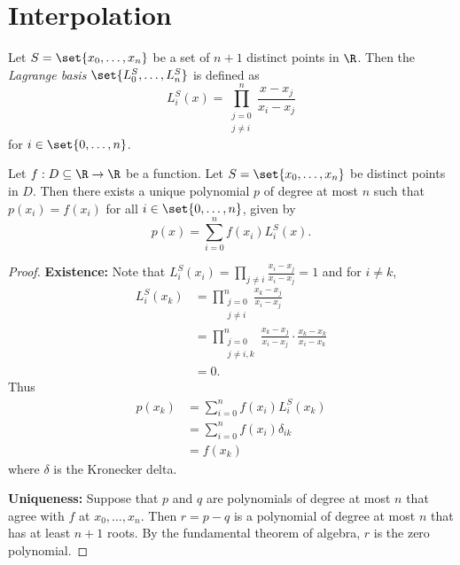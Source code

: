 \documentclass[12pt]{article}
\begin{document}
\section{Interpolation} \label{sec:interpolation}
\begin{definition} \label{def:interpolation:lagrange}
    Let $S = \set{x_0, \dots, x_n}$ be a set of $n + 1$ distinct points in $\R$.
    Then the \emph{Lagrange basis} $\set{L_0^S, \dots, L_n^S}$ is defined as \[
        L_i^S(x) = \prod_{\substack{j = 0 \\ j \neq i}}^n
            \frac{x - x_j}{x_i - x_j}
    \] for $i \in \set{0, \dots, n}$.
\end{definition}
\begin{theorem} \label{thm:interpolation:unique}
    Let $f : D \subseteq \R \to \R$ be a function.
    Let $S = \set{x_0, \dots, x_n}$ be distinct points in $D$.
    Then there exists a unique polynomial $p$ of degree at most $n$ such that
    $p(x_i) = f(x_i)$ for all $i \in \set{0, \dots, n}$, given by \[
        p(x) = \sum_{i=0}^n f(x_i) L_i^S(x).
    \]
\end{theorem}
\begin{proof}
    \textbf{Existence:} Note that
    $L_i^S(x_i) = \prod_{j \neq i} \frac{x_i - x_j}{x_i - x_j} = 1$ and for
    $i \neq k$, \begin{align*}
        L_i^S(x_k) &= \prod_{\substack{j = 0 \\ j \neq i}}^n
                \frac{x_k - x_j}{x_i - x_j} \\
            &= \prod_{\substack{j = 0 \\ j \neq i, k}}^n
                \frac{x_k - x_j}{x_i - x_j} \cdot \frac{x_k - x_k}{x_i - x_k} \\
            &= 0.
    \end{align*}
    Thus \begin{align*}
        p(x_k) &= \sum_{i=0}^n f(x_i) L_i^S(x_k) \\
              &= \sum_{i=0}^n f(x_i) \delta_{ik} \\
              &= f(x_k)
    \end{align*}
    where $\delta$ is the Kronecker delta.

    \textbf{Uniqueness:} Suppose that $p$ and $q$ are polynomials of degree at
    most $n$ that agree with $f$ at $x_0, \dots, x_n$.
    Then $r = p - q$ is a polynomial of degree at most $n$ that has at least
    $n + 1$ roots.
    By the fundamental theorem of algebra, $r$ is the zero polynomial.
\end{proof}
\end{document}
